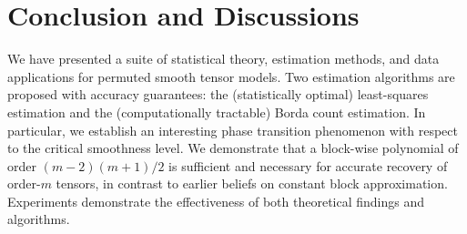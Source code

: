 \documentclass[12pt]{article}
\theoremstyle{definition}
\begin{document}
\section{Conclusion and Discussions}\label{sec:discussion}
We have presented a suite of statistical theory, estimation methods, and data applications for permuted smooth tensor models. 
 Two estimation algorithms are proposed with accuracy guarantees: the (statistically optimal) least-squares estimation and the (computationally tractable) Borda count estimation.
In particular, we establish an interesting phase transition phenomenon with respect to the critical smoothness level. We demonstrate that a block-wise polynomial of order $(m-2)(m+1)/2$ is sufficient and necessary for accurate recovery of order-$m$ tensors, in contrast to earlier beliefs on constant block approximation. Experiments demonstrate the effectiveness of both theoretical findings and algorithms. 
\end{document}
